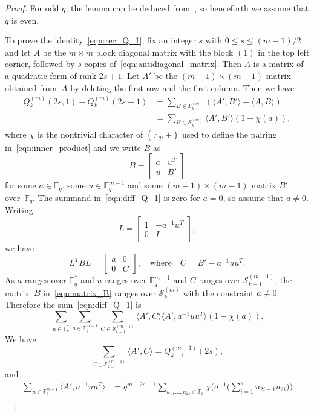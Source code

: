 \documentclass[10pt]{article}
\theoremstyle{definition}
\newcommand{\FF}{\mathbb{F}}
\renewcommand{\S}{\mathscr{S}}
\newcommand{\ang}[1]{\langle#1\rangle}
\begin{document}
\begin{proof}
For odd $q$, the lemma can be deduced from~\cite[Lemma~6.1]{Sch2015}, so henceforth we assume that $q$ is even.
\par
To prove the identity~\eqref{eqn:rec_Q_1}, fix an integer $s$ with $0\le s\le (m-1)/2$ and let $A$ be the $m\times m$ block diagonal matrix with the block $(1)$ in the top left corner, followed by $s$ copies of~\eqref{eqn:antidiagonal_matrix}. Then $A$ is a matrix of a quadratic form of rank $2s+1$. Let $A'$ be the $(m-1)\times (m-1)$ matrix obtained from~$A$ by deleting the first row and the first column. Then we have
\begin{align}
Q^{(m)}_k(2s,1)-Q^{(m)}_k(2s+1)&=\sum_{B\in\S^{(m)}_k}(\ang{A',B'}-\ang{A,B})   \nonumber\\
&=\sum_{B\in\S^{(m)}_k}\ang{A',B'}(1-\chi(a)),   \label{eqn:diff_Q_1}
\end{align}
where $\chi$ is the nontrivial character of $(\FF_q,+)$ used to define the pairing in~\eqref{eqn:inner_product} and we write $B$ as
\begin{equation}
B=\begin{bmatrix}
a & u^T\\
u & B'
\end{bmatrix}   \label{eqn:matrix_B}
\end{equation}
for some $a\in\FF_q$, some $u\in\FF_q^{m-1}$ and some $(m-1)\times (m-1)$ matrix $B'$ over~$\FF_q$. The summand in~\eqref{eqn:diff_Q_1} is zero for $a=0$, so assume that $a\ne 0$. Writing
\[
L=\begin{bmatrix}
1 & -a^{-1}u^T\\
0 & I
\end{bmatrix},
\]
we have
\[
L^TBL=\begin{bmatrix}
a & 0\\
0 & C
\end{bmatrix},
\quad\text{where}\quad
C=B'-a^{-1}uu^T.
\]
As $a$ ranges over $\FF_q^*$ and $u$ ranges over $\FF_q^{m-1}$ and $C$ ranges over $\S^{(m-1)}_{k-1}$, the matrix~$B$ in~\eqref{eqn:matrix_B} ranges over $\S^{(m)}_k$ with the constraint $a\ne 0$. Therefore the sum~\eqref{eqn:diff_Q_1} is
\[
\sum_{a\in\FF_q^*}\sum_{u\in\FF_q^{m-1}}\sum_{C\in\S^{(m-1)}_{k-1}}\ang{A',C}\ang{A',a^{-1}uu^T}(1-\chi(a)).
\]
We have
\[
\sum_{C\in\S^{(m-1)}_{k-1}}\ang{A',C}=Q^{(m-1)}_{k-1}(2s),
\]
and
\begin{align*}
\sum_{u\in\FF_q^{m-1}}\ang{A',a^{-1}uu^T}&=q^{m-2s-1}\sum_{u_1,\dots,u_{2s}\in\FF_q}\chi\bigg(a^{-1}\bigg(\sum_{i=1}^su_{2i-1}u_{2i}\bigg)\bigg)\\

\end{align*}
\end{proof}
\end{document}
